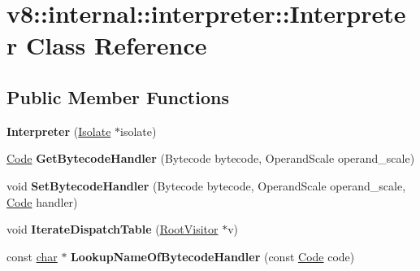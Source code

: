 \hypertarget{classv8_1_1internal_1_1interpreter_1_1Interpreter}{}\section{v8\+:\+:internal\+:\+:interpreter\+:\+:Interpreter Class Reference}
\label{classv8_1_1internal_1_1interpreter_1_1Interpreter}
\subsection*{Public Member Functions}
\begin{DoxyCompactItemize}
\item 
\mbox{\label{classv8_1_1internal_1_1interpreter_1_1Interpreter_af89f24c8ab451e62383e262fc3c0fdbd}} 
{\bfseries Interpreter} (\mbox{\hyperlink{classv8_1_1internal_1_1Isolate}{Isolate}} $\ast$isolate)
\item 
\mbox{\label{classv8_1_1internal_1_1interpreter_1_1Interpreter_aa221aa17ea5f172b04816275e72495f5}} 
\mbox{\hyperlink{classv8_1_1internal_1_1Code}{Code}} {\bfseries Get\+Bytecode\+Handler} (Bytecode bytecode, Operand\+Scale operand\+\_\+scale)
\item 
\mbox{\label{classv8_1_1internal_1_1interpreter_1_1Interpreter_a54034611e85b57f2f159296b0abb4ed7}} 
void {\bfseries Set\+Bytecode\+Handler} (Bytecode bytecode, Operand\+Scale operand\+\_\+scale, \mbox{\hyperlink{classv8_1_1internal_1_1Code}{Code}} handler)
\item 
\mbox{\label{classv8_1_1internal_1_1interpreter_1_1Interpreter_a677ccc0941ba927bcb44e81eae4cc8ba}} 
void {\bfseries Iterate\+Dispatch\+Table} (\mbox{\hyperlink{classv8_1_1internal_1_1RootVisitor}{Root\+Visitor}} $\ast$v)
\item 
\mbox{\label{classv8_1_1internal_1_1interpreter_1_1Interpreter_acd8533358566fc09305f9827a899c686}} 
const \mbox{\hyperlink{classchar}{char}} $\ast$ {\bfseries Lookup\+Name\+Of\+Bytecode\+Handler} (const \mbox{\hyperlink{classv8_1_1internal_1_1Code}{Code}} code)

\end{DoxyCompactItemize}
